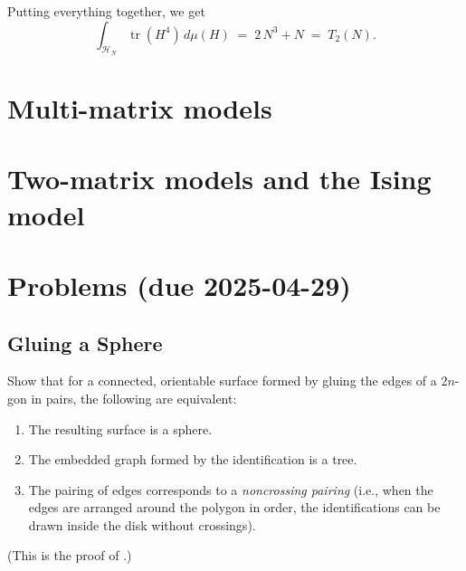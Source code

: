 \documentclass[letterpaper,11pt,oneside,reqno]{article}
\numberwithin{equation}{section}
\theoremstyle{definition}
\begin{document}
Putting everything together, we get
\[
  \int_{\mathcal{H}_N}\!\operatorname{tr}(H^4)\,d\mu(H)
  \;=\;
  2\,N^3 + N
  \;=\;
  T_2(N).
\]









\section{Multi-matrix models}



\section{Two-matrix models and the Ising model}




























\appendix
\setcounter{section}{14}

\section{Problems (due 2025-04-29)}

\subsection{Gluing a Sphere}
\label{prob:gluing_sphere}
Show that for a connected, orientable surface formed by gluing the edges of a $2n$-gon in pairs, the following are equivalent:
\begin{enumerate}
	\item The resulting surface is a sphere.
	\item The embedded graph formed by the identification is a tree.
	\item The pairing of edges corresponds to a \emph{noncrossing pairing} (i.e., when the edges are arranged around the polygon in order, the identifications can be drawn inside the disk without crossings).
\end{enumerate}
(This is the proof of .)
\end{document}
